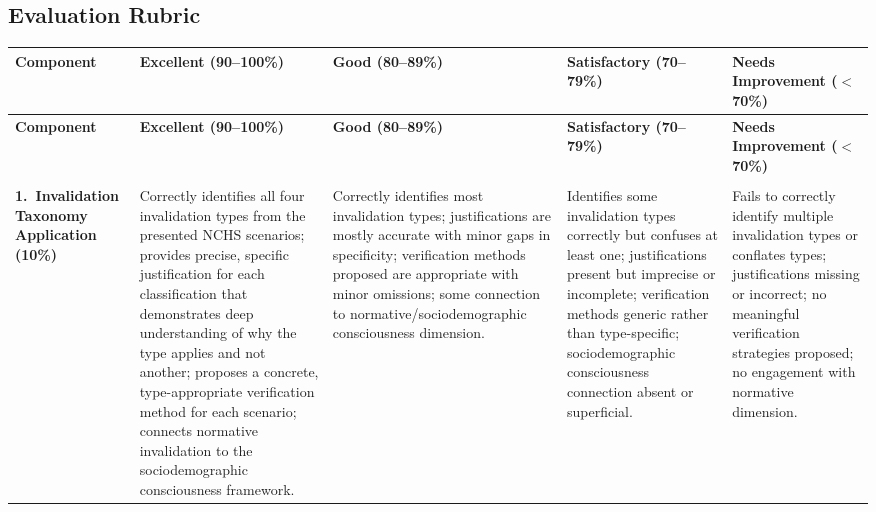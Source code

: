\begin{landscape}

    \section{Evaluation Rubric}

    {\scriptsize

    \begin{longtable}{%
        >{\RaggedRight\arraybackslash}p{2.5cm}   %
        >{\RaggedRight\arraybackslash}p{4.5cm}   %
        >{\RaggedRight\arraybackslash}p{4.2cm}   %
        >{\RaggedRight\arraybackslash}p{4.2cm}   %
        >{\RaggedRight\arraybackslash}p{4.5cm}}  %

    \toprule
    \textbf{Component} &
    \textbf{Excellent (90--100\%)} &
    \textbf{Good (80--89\%)} &
    \textbf{Satisfactory (70--79\%)} &
    \textbf{Needs Improvement ($<$70\%)} \\
    \midrule
    \endfirsthead

    \toprule
    \textbf{Component} &
    \textbf{Excellent (90--100\%)} &
    \textbf{Good (80--89\%)} &
    \textbf{Satisfactory (70--79\%)} &
    \textbf{Needs Improvement ($<$70\%)} \\
    \midrule
    \endhead

    \midrule
    \multicolumn{5}{r}{\textit{Continued on next page}} \\
    \endfoot

    \bottomrule
    \endlastfoot

    \textbf{1.\ Invalidation Taxonomy Application}
    \newline\textbf{(10\%)}
    &
    Correctly identifies all four invalidation types from the
    presented NCHS scenarios; provides precise, specific
    justification for each classification that demonstrates deep
    understanding of why the type applies and not another;
    proposes a concrete, type-appropriate verification method for
    each scenario; connects normative invalidation to the
    sociodemographic consciousness framework.
    &
    Correctly identifies most invalidation types; justifications
    are mostly accurate with minor gaps in specificity;
    verification methods proposed are appropriate with minor
    omissions; some connection to normative/sociodemographic consciousness
    dimension.
    &
    Identifies some invalidation types correctly but confuses
    at least one; justifications present but imprecise or
    incomplete; verification methods generic rather than
    type-specific; sociodemographic consciousness connection absent or
    superficial.
    &
    Fails to correctly identify multiple invalidation types or
    conflates types; justifications missing or incorrect;
    no meaningful verification strategies proposed; no engagement
    with normative dimension.
    \\
    \midrule


\end{longtable}}
\end{landscape}
